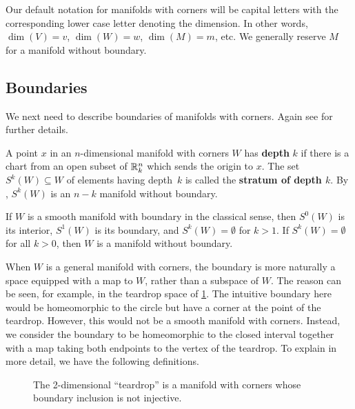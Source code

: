 \begin{notation}
	Our default notation for manifolds with corners will be capital letters with the corresponding lower case letter denoting the dimension.
	In other words, $\dim(V) = v$, $\dim(W) = w$, $\dim(M) = m$, etc.
	We generally reserve $M$ for a manifold without boundary.
\end{notation}

\subsection{Boundaries}\label{S: boundaries}

We next need to describe boundaries of manifolds with corners.
Again see \cite[Section 2]{Joy12} for further details.

\begin{definition}
	A point $x$ in an $n$-dimensional manifold with corners $W$ has \textbf{depth} $k$ if there is a chart from an open subset of $\mathbb{R}^n_k$ which sends the origin to $x$.
	The set $S^k(W) \subseteq W$ of elements having depth~$k$ is called the \textbf{stratum of depth $k$}.
	By \cite[Proposition 2.4.]{Joy12}, $S^k(W)$ is an $n-k$ manifold without boundary.
\end{definition}

\begin{example}
	If $W$ is a smooth manifold with boundary in the classical sense, then $S^0(W)$ is its interior, $S^1(W)$ is its boundary, and $S^k(W) = \emptyset$ for $k>1$.
	If $S^k(W) = \emptyset$ for all $k>0$, then $W$ is a manifold without boundary.
\end{example}

When $W$ is a general manifold with corners, the boundary is more naturally a space equipped with a map to $W$, rather than a subspace of $W$.
The reason can be seen, for example, in the teardrop space of \cref{F: teardrop}.
The intuitive boundary here would be homeomorphic to the circle but have a corner at the point of the teardrop.
However, this would not be a smooth manifold with corners.
Instead, we consider the boundary to be homeomorphic to the closed interval together with a map taking both endpoints to the vertex of the teardrop.
To explain in more detail, we have the following definitions.

\begin{figure}[h]
	
	\caption{The 2-dimensional ``teardrop'' is a manifold with corners whose boundary inclusion is not injective.}
	\label{F: teardrop}
\end{figure}

